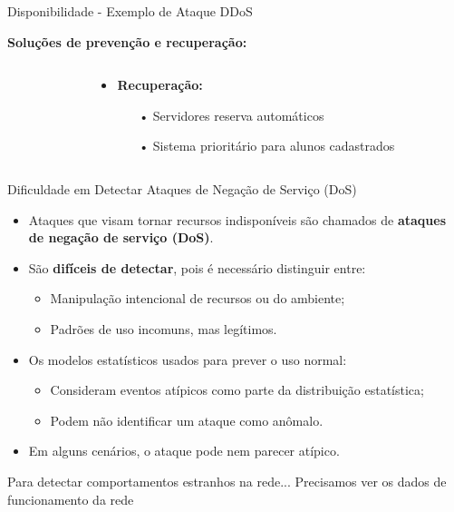 \begin{frame}{Disponibilidade - Exemplo de Ataque DDoS}
\begin{block}{\textbf{Soluções de prevenção e recuperação:}}
\begin{columns}
\begin{column}{0.5\textwidth}
            \end{column}
            \begin{column}{0.5\textwidth}
                \begin{itemize}
                    \item \textbf{Recuperação:}
                          \begin{itemize}
                              \item[•] Servidores reserva automáticos
                              \item[•] Sistema prioritário para alunos cadastrados
                          \end{itemize}
                \end{itemize}

            \end{column}
        \end{columns}
    \end{block}


\end{frame}

\begin{frame}{Dificuldade em Detectar Ataques de Negação de Serviço (DoS)}
    \begin{itemize}
        \item Ataques que visam tornar recursos indisponíveis são chamados de \textbf{ataques de negação de serviço (DoS)}.
        \item São \textbf{difíceis de detectar}, pois é necessário distinguir entre:
              \begin{itemize}
                  \item Manipulação intencional de recursos ou do ambiente;
                  \item Padrões de uso incomuns, mas legítimos.
              \end{itemize}
        \item Os modelos estatísticos usados para prever o uso normal:
              \begin{itemize}
                  \item Consideram eventos atípicos como parte da distribuição estatística;
                  \item Podem não identificar um ataque como anômalo.
              \end{itemize}
        \item Em alguns cenários, o ataque pode nem parecer atípico.
    \end{itemize}

    \begin{block}{Para detectar comportamentos estranhos na rede...}
        Precisamos ver os dados de funcionamento da rede
    \end{block}
\end{frame}


